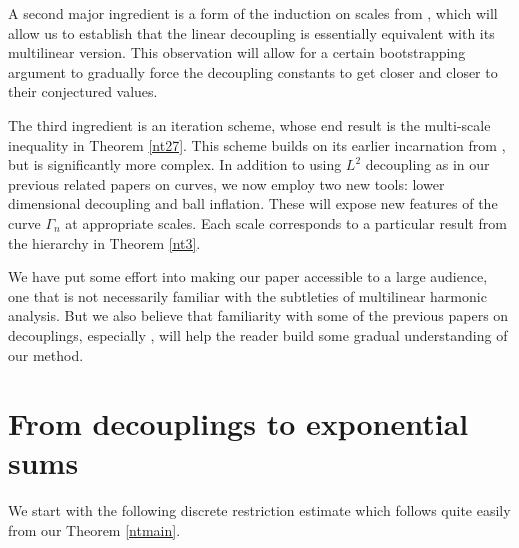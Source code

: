 \documentclass[amssymb,amsfonts,12pt]{amsart}
\begin{document}
A second major ingredient is a form of the induction on scales from \cite{BG}, which will allow us to establish that the linear decoupling is essentially equivalent with its multilinear version. This observation will allow for a certain bootstrapping argument to gradually force the decoupling constants to get closer and closer to their conjectured values.
\bigskip

The third ingredient is an iteration scheme, whose end result is the multi-scale inequality in Theorem \ref{nt27}. This scheme builds on its earlier incarnation from \cite{BD4}, but is significantly more complex. In addition to using $L^2$ decoupling as in our previous related papers on curves, we now employ two new tools: lower dimensional decoupling and ball inflation. These will expose new features of the curve $\Gamma_n$ at appropriate scales. Each scale corresponds to a particular result from the hierarchy in Theorem \ref{nt3}.
\bigskip



We have put some effort into making our paper accessible to a large audience, one that is not necessarily familiar with the subtleties of multilinear harmonic analysis. But we also believe that  familiarity with some of the previous papers on decouplings, especially \cite{BD3}, will help the reader build some gradual understanding of our method.




\bigskip

\section{From decouplings to exponential sums}
\label{decexp}

We start with the following discrete restriction estimate which follows quite easily from our Theorem \ref{ntmain}.
\end{document}
